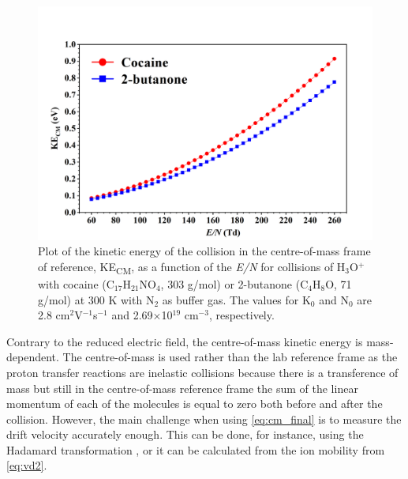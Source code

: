 \begin{figure}[t]
\centering
\includegraphics[width=0.7\linewidth]{pics/KE.png}
\centering
\caption{Plot of the kinetic energy of the collision
in the centre-of-mass frame of reference, KE\textsubscript{CM}, as a function of the \textit{E/N} for
collisions of H$_3$O$^+$ with cocaine (C$_{17}$H$_{21}$NO$_4$, 303 g/mol) or 2-butanone (C$_4$H$_8$O, 71 g/mol) at 300 K with N$_2$ as buffer gas. The values for K$_0$ and N$_0$ are  2.8 cm$^2$V$^{-1}$s$^{-1}$ and 2.69$\times$10$^{19}$ cm$^{-3}$, respectively.}
\label{fig:KE}
\end{figure}

















Contrary to the reduced electric field, the centre-of-mass kinetic energy is mass-dependent. %
The centre-of-mass is used rather than the lab reference frame as the proton transfer reactions are inelastic collisions because there is a transference of mass but still in the centre-of-mass reference frame the sum of the linear momentum of each of the molecules is equal to zero both before and after the collision. %
%
%
However, the main challenge when using \autoref{eq:cm_final} is to measure the drift velocity accurately enough. This can be done, for instance, using the Hadamard transformation \cite{doi:10.1002/rcm.7254}, or it can be calculated from the ion mobility from \autoref{eq:vd2}.






